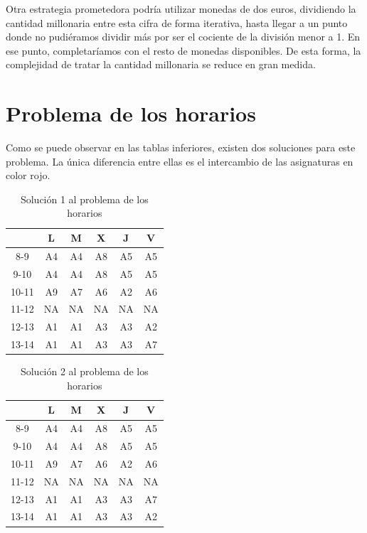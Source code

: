 \documentclass[12pt]{article} %
\begin{document}
Otra estrategia prometedora podría utilizar monedas de dos euros, dividiendo la cantidad millonaria entre esta cifra de forma iterativa, hasta llegar a un punto donde no pudiéramos dividir más por ser el cociente de la división menor a 1. En ese punto, completaríamos con el resto de monedas disponibles. De esta forma, la complejidad de tratar la cantidad millonaria se reduce en gran medida.

\section{Problema de los horarios}
Como se puede observar en las tablas inferiores, existen dos soluciones para este problema. La única diferencia entre ellas es el intercambio de las asignaturas en color rojo.

\begin{table}[H]
\centering
\begin{tabular}{c|ccccc}
\multicolumn{1}{l|}{} & L  & M  & X  & J  & V  \\ \hline
8-9                   & A4 & A4 & A8 & A5 & A5 \\
9-10                  & A4 & A4 & A8 & A5 & A5 \\
10-11                 & A9 & A7 & A6 & A2 & A6 \\
11-12                 & NA & NA & NA & NA & NA \\
12-13                 & A1 & A1 & A3 & A3 & \color{red}A2 \\
13-14                 & A1 & A1 & A3 & A3 & \color{red}A7
\end{tabular}
\caption{Solución 1 al problema de los horarios}
\label{tab:my-table}
\end{table}
\vspace{2pt}
\begin{table}[H]
\centering
\begin{tabular}{c|ccccc}
\multicolumn{1}{l|}{} & L  & M  & X  & J  & V  \\ \hline
8-9                   & A4 & A4 & A8 & A5 & A5 \\
9-10                  & A4 & A4 & A8 & A5 & A5 \\
10-11                 & A9 & A7 & A6 & A2 & A6 \\
11-12                 & NA & NA & NA & NA & NA \\
12-13                 & A1 & A1 & A3 & A3 & \color{red}A7 \\
13-14                 & A1 & A1 & A3 & A3 & \color{red}A2
\end{tabular}
\caption{Solución 2 al problema de los horarios}
\label{tab:my-table}
\end{table}
\end{document}
